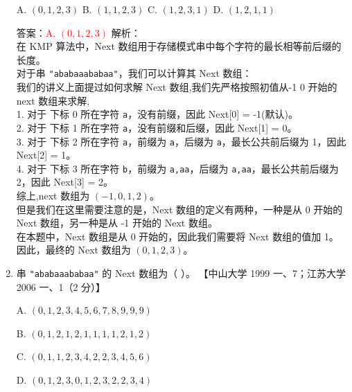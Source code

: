 \documentclass[lang=cn,newtx,10pt,scheme=chinese]{../../../elegantbook}
\begin{document}
\begin{enumerate}
    A. $(0, 1, 2, 3)$ \quad B. $(1, 1, 2, 3)$ \quad C. $(1, 2, 3, 1)$ \quad D. $(1, 2, 1, 1)$  

    答案：\textcolor{red}{A. $(0, 1, 2, 3)$}
    解析：\\
    在 KMP 算法中，Next 数组用于存储模式串中每个字符的最长相等前后缀的长度。\\
    对于串 \texttt{"ababaaababaa"}，我们可以计算其 Next 数组：\\
    我们的讲义上面提过如何求解 Next 数组,我们先严格按照初值从-1 0 开始的next 数组来求解,\\
    1. 对于 下标 0 所在字符 \texttt{a}，没有前缀，因此 Next[0] = -1(默认)。\\
    2. 对于 下标 1 所在字符 \texttt{a}，没有前缀和后缀，因此 Next[1] = 0。\\
    3. 对于 下标 2 所在字符 \texttt{a}，前缀为 \texttt{a}，后缀为 \texttt{a}，最长公共前后缀为 1，因此 Next[2] = 1。\\
    4. 对于 下标 3 所在字符 \texttt{b}，前缀为 \texttt{a,aa}，后缀为 \texttt{a,aa}，最长公共前后缀为 2，因此 Next[3] = 2。\\

    综上,next 数组为 $(-1,0,1,2)$。\\
    但是我们在这里需要注意的是，Next 数组的定义有两种，一种是从 0 开始的 Next 数组，另一种是从 -1 开始的 Next 数组。\\
    在本题中，Next 数组是从 0 开始的，因此我们需要将 Next 数组的值加 1。\\
    因此，最终的 Next 数组为 $(0, 1, 2, 3)$。\\

    \item 串 \texttt{"ababaaababaa"} 的 Next 数组为（ ）。  
    【中山大学 1999 一、7；江苏大学 2006 一、1（2 分）】  

    A. $(0, 1, 2, 3, 4, 5, 6, 7, 8,9,9,9)$  

    B. $(0, 1, 2, 1, 2, 1, 1, 1, 1,2,1,2)$  

    C. $(0, 1, 1, 2, 3, 4, 2, 2, 3,4,5,6)$  

    D. $(0, 1, 2, 3, 0, 1, 2, 3, 2,2,3,4)$  


\end{enumerate}
\end{document}
